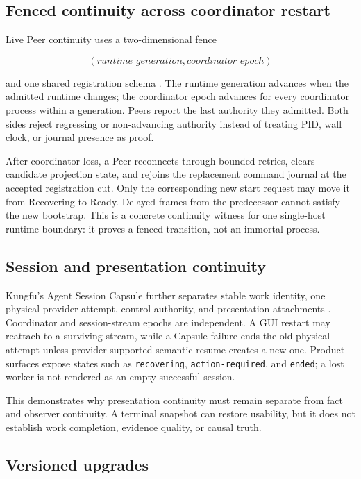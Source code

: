 \subsection{Fenced continuity across coordinator restart}

Live Peer continuity uses a two-dimensional fence

\[
(\mathit{runtime\_generation}, \mathit{coordinator\_epoch})
\]

and one shared registration schema \cite{kungfu2026peercontinuity}. The runtime
generation advances when the admitted runtime changes; the coordinator epoch
advances for every coordinator process within a generation. Peers report the
last authority they admitted. Both sides reject regressing or non-advancing
authority instead of treating PID, wall clock, or journal presence as proof.

After coordinator loss, a Peer reconnects through bounded retries, clears
candidate projection state, and rejoins the replacement command journal at the
accepted registration cut. Only the corresponding new start request may move
it from Recovering to Ready. Delayed frames from the predecessor cannot satisfy
the new bootstrap. This is a concrete continuity witness for one single-host
runtime boundary: it proves a fenced transition, not an immortal process.

\subsection{Session and presentation continuity}

Kungfu's Agent Session Capsule further separates stable work identity, one
physical provider attempt, control authority, and presentation attachments
\cite{kungfu2026agentsession}. Coordinator and session-stream epochs are
independent. A GUI restart may reattach to a surviving stream, while a Capsule
failure ends the old physical attempt unless provider-supported semantic resume
creates a new one. Product surfaces expose states such as \texttt{recovering},
\texttt{action-required}, and \texttt{ended}; a lost worker is not rendered as
an empty successful session.

This demonstrates why presentation continuity must remain separate from fact
and observer continuity. A terminal snapshot can restore usability, but it does
not establish work completion, evidence quality, or causal truth.

\subsection{Versioned upgrades}

